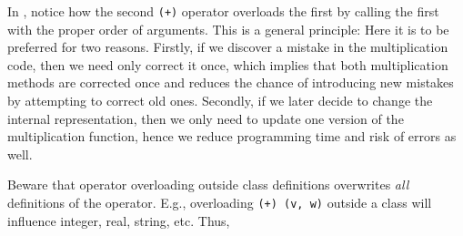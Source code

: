 In , notice how the second \lstinline{(+)} operator overloads the first by calling the first with the proper order of arguments. This is a general principle:  Here it is to be preferred for two reasons. Firstly, if we discover a mistake in the multiplication code, then we need only correct it once, which implies that both multiplication methods are corrected once and reduces the chance of introducing new mistakes by attempting to correct old ones. Secondly, if we later decide to change the internal representation, then we only need to update one version of the multiplication function, hence we reduce programming time and risk of errors as well.

Beware that operator overloading outside class definitions overwrites \emph{all} definitions of the operator. E.g., overloading \lstinline{(+) (v, w)} outside a class will influence integer, real, string, etc. Thus, 


